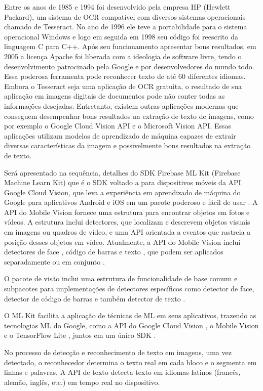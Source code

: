Entre os anos de 1985 e 1994 foi desenvolvido pela empresa HP (Hewlett Packard), um sistema de OCR compatível com diversos sistemas operacionais chamado de Tesseract. No ano de 1996 ele teve a portabilidade para o sistema operacional Windows e logo em seguida em 1998 seu código foi reescrito da linguagem C para C++. Após seu funcionamento apresentar bons resultados, em 2005 a licença Apache foi liberada com a ideologia de software livre, tendo o desenvolvimento patrocinado pela Google e por desenvolvedores do mundo todo. Essa poderosa ferramenta pode reconhecer texto de até 60 diferentes idiomas. Embora o Tesseract seja uma aplicação de OCR gratuita, o resultado de sua aplicação em imagens digitais de documentos pode não conter todas as informações desejadas. Entretanto, existem outras aplicações modernas que conseguem desempenhar bons resultados na extração de texto de imagens, como por exemplo o Google Cloud Vision API e o Microsoft Vision API. Essas aplicações utilizam modelos de aprendizado de máquina capazes de extrair diversas características da imagem e possivelmente bons resultados na extração de texto.

Será apresentado na sequência, detalhes do SDK Firebase ML Kit (Firebase Machine Learn Kit) que é o SDK voltado a para dispositivos móveis da API Google Cloud Vision, que leva a experiência em aprendizado de máquina do Google para aplicativos Android e iOS em um pacote poderoso e fácil de usar \cite{CODELABS}. A API do Mobile Vision fornece uma estrutura para encontrar objetos em fotos e vídeos. A estrutura inclui detectores, que localizam e descrevem objetos visuais em imagens ou quadros de vídeo, e uma API orientada a eventos que rastreia a posição desses objetos em vídeo. Atualmente, a API do Mobile Vision inclui detectores de face , código de barras e texto , que podem ser aplicados separadamente ou em conjunto \cite{INTROMOBILEVISION}.

O pacote de visão inclui uma estrutura de funcionalidade de base comum e subpacotes para implementações de detectores específicos como detector de face, detector de código de barras e também detector de texto \cite{INTROMOBILEVISION}.

O ML Kit facilita a aplicação de técnicas de ML em seus aplicativos, trazendo as tecnologias ML do Google, como a API do Google Cloud Vision , o Mobile Vision e o TensorFlow Lite , juntos em um único SDK \cite{CODELABS}.

No processo de detecção e reconhecimento de texto em imagens, uma vez detectado, o reconhecedor determina o texto real em cada bloco e o segmenta em linhas e palavras. A API de texto detecta texto em idiomas latinos (francês, alemão, inglês, etc.) em tempo real no dispositivo.

